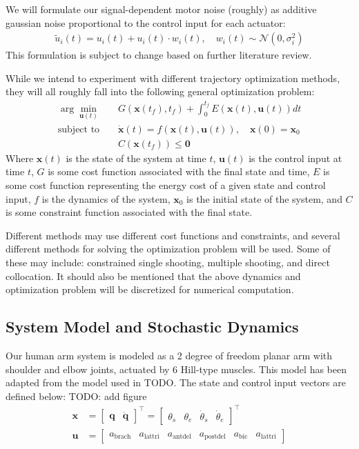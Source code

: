 \documentclass[table,12pt]{article}
\begin{document}
We will formulate our signal-dependent motor noise (roughly) as additive gaussian noise proportional to the control input for each actuator:
\begin{align}
    \tilde{u}_i(t) = u_i(t) + u_i(t) \cdot w_i(t), \quad w_i(t) \sim \mathcal{N}(0, \sigma_i^2)
\end{align}
This formulation is subject to change based on further literature review.

While we intend to experiment with different trajectory optimization methods, they will all roughly fall into the following general optimization problem:
\begin{align}
    \arg\min_{\mathbf{u}(t)} &\quad G\left(\mathbf{x}(t_f), t_f\right) + \int_0^{t_f} E(\mathbf{x}(t), \mathbf{u}(t)) dt \\
    \text{subject to} &\quad \dot{\mathbf{x}}(t) = f(\mathbf{x}(t), \mathbf{u}(t)), \quad \mathbf{x}(0) = \mathbf{x}_0 \\
    &\quad C(\mathbf{x}(t_f)) \leq \mathbf{0}
\end{align}
Where $\mathbf{x}(t)$ is the state of the system at time $t$, $\mathbf{u}(t)$ is the control input at time $t$, $G$ is some cost function associated with the final state and time, $E$ is some cost function representing the energy cost of a given state and control input, $f$ is the dynamics of the system, $\mathbf{x}_0$ is the initial state of the system, and $C$ is some constraint function associated with the final state.

Different methods may use different cost functions and constraints, and several different methods for solving the optimization problem will be used. Some of these may include: constrained single shooting, multiple shooting, and direct collocation. It should also be mentioned that the above dynamics and optimization problem will be discretized for numerical computation.

\subsection{System Model and Stochastic Dynamics}
Our human arm system is modeled as a 2 degree of freedom planar arm with shoulder and elbow joints, actuated by 6 Hill-type muscles. This model has been adapted from the model used in TODO. The state and control input vectors are defined below:
TODO: add figure
\begin{align}
    \mathbf{x} &= \begin{bmatrix}
        \mathbf{q} &
        \dot{\mathbf{q}}
    \end{bmatrix}^\top = \begin{bmatrix}
        \theta_s &
        \theta_e &
        \dot{\theta}_s &
        \dot{\theta}_e
    \end{bmatrix}^\top \\
    \mathbf{u} &= \begin{bmatrix}
        a_{\text{brach}} & a_{\text{lattri}} & a_{\text{antdel}} & a_{\text{postdel}} & a_{\text{bic}} & a_{\text{lattri}}
    \end{bmatrix}
\end{align}
\end{document}
